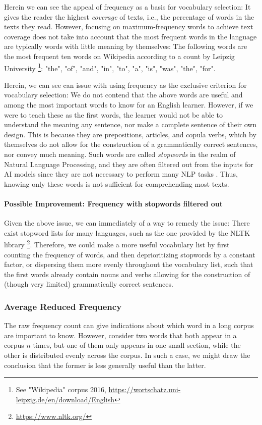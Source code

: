 Herein we can see the appeal of frequency as a basis for vocabulary selection:
It gives the reader the highest \textit{coverage} of texts, i.e., the percentage of words in the texts they read.
However, focusing on maximum-frequency words to achieve text coverage does not take into account that the most frequent words in the language are typically words with little meaning by themselves:
The following words are the most frequent ten words on Wikipedia according to a count by Leipzig University \footnote{See "Wikipedia" corpus 2016, \url{https://wortschatz.uni-leipzig.de/en/download/English}}:
"the", "of", "and", "in", "to", "a", "is", "was", "the", "for".

Herein, we can see can issue with using frequency as the exclusive criterion for vocabulary selection:
We do not contend that the above words are useful and among the most important words to know for an English learner.
However, if we were to teach these as the first words, the learner would not be able to understand the meaning any sentence, nor make a complete sentence of their own design.
This is because they are prepositions, articles, and copula verbs, which by themselves do not allow for the construction of a grammatically correct sentences, nor convey much meaning.
Such words are called \textit{stopwords} in the realm of Natural Language Processing, and they are often filtered out from the inputs for AI models since they are not necessary to perform many NLP tasks .
Thus, knowing only these words is not sufficient for comprehending most texts.


\paragraph {Possible Improvement: Frequency with stopwords filtered out}
Given the above issue, we can immediately of a way to remedy the issue:
There exist stopword lists for many languages, such as the one provided by the NLTK library \footnote{\url{https://www.nltk.org/}}.
Therefore, we could make a more useful vocabulary list by first counting the frequency of words, and then deprioritizing stopwords by a constant factor, or dispersing them more evenly throughout the vocabulary list, such that the first words already contain nouns and verbs allowing for the construction of (though very limited) grammatically correct sentences.


\subsubsection {Average Reduced Frequency}
The raw frequency count can give indications about which word in a long corpus are important to know.
However, consider two words that both appear in a corpus $n$ times, but one of them only appears in one small section, while the other is distributed evenly across the corpus.
In such a case, we might draw the conclusion that the former is less generally useful than the latter.

